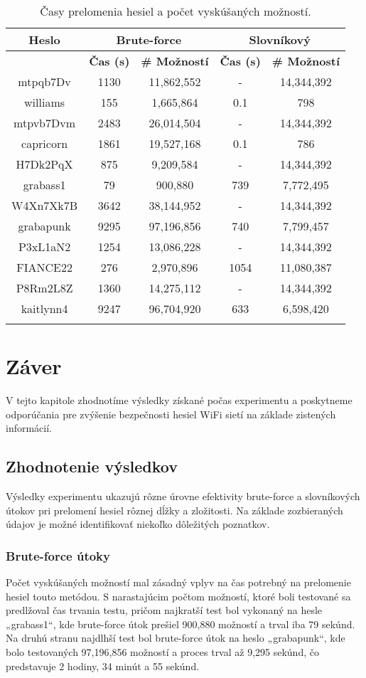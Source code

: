 \documentclass[12pt, twoside]{book}
\begin{document}
\begin{longtable}{|c|c|c|c|c|}
\hline
\textbf{Heslo} & \multicolumn{2}{|c|}{\textbf{Brute-force}} & \multicolumn{2}{|c|}{\textbf{Slovníkový}} \\ \hline
& \textbf{Čas (s)} & \textbf{\# Možností} & \textbf{Čas (s)} & \textbf{\# Možností} \\ \hline
mtpqb7Dv & 1130 & 11,862,552 & - & 14,344,392 \\ \hline
williams & 155 & 1,665,864& 0.1 & 798 \\ \hline
mtpvb7Dvm & 2483 & 26,014,504 & - & 14,344,392 \\ \hline
capricorn & 1861 & 19,527,168 & 0.1 & 786 \\ \hline
H7Dk2PqX & 875 & 9,209,584 & - & 14,344,392  \\ \hline
grabass1 & 79 & 900,880 & 739 & 7,772,495 \\ \hline
W4Xn7Xk7B & 3642 & 38,144,952 & - & 14,344,392 \\ \hline
grabapunk & 9295 & 97,196,856 & 740 & 7,799,457 \\ \hline
P3xL1aN2 & 1254 & 13,086,228 & - & 14,344,392 \\ \hline
FIANCE22 & 276 & 2,970,896 & 1054 & 11,080,387 \\ \hline
P8Rm2L8Z & 1360 & 14,275,112 & - & 14,344,392 \\ \hline
kaitlynn4 & 9247 & 96,704,920 & 633 & 6,598,420 \\ \hline
\caption{Časy prelomenia hesiel a počet vyskúšaných možností.}
\end{longtable}


\section{Záver}
V tejto kapitole zhodnotíme výsledky získané počas experimentu a poskytneme odporúčania pre zvýšenie bezpečnosti hesiel WiFi sietí na základe zistených informácií.

\subsection{Zhodnotenie výsledkov}
Výsledky experimentu ukazujú rôzne úrovne efektivity brute-force a slovníkových útokov pri prelomení hesiel rôznej dĺžky a zložitosti. Na základe zozbieraných údajov je možné identifikovať niekoľko dôležitých poznatkov.

\subsubsection{Brute-force útoky}
Počet vyskúšaných možností mal zásadný vplyv na čas potrebný na prelomenie hesiel touto metódou. S narastajúcim počtom možností, ktoré boli testované sa predlžoval čas trvania testu, pričom najkratší test bol vykonaný na hesle „grabass1“, kde brute-force útok prešiel 900,880 možností a trval iba 79 sekúnd. Na druhú stranu najdlhší test bol brute-force útok na heslo „grabapunk“, kde bolo testovaných 97,196,856 možností a proces trval až 9,295 sekúnd, čo predstavuje 2 hodiny, 34 minút a 55 sekúnd.
\end{document}
